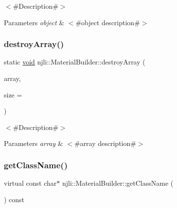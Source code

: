 $<$\#\+Description\#$>$


\begin{DoxyParams}{Parameters}
{\em object} & $<$\#object description\#$>$ \\
\hline
\end{DoxyParams}
\mbox{\label{classnjli_1_1_material_builder_ae9f327274245a38631fbe03c44479583}} 
\subsubsection{\texorpdfstring{destroy\+Array()}{destroyArray()}}
{\footnotesize\ttfamily static \mbox{\hyperlink{_thread_8h_af1e856da2e658414cb2456cb6f7ebc66}{void}} njli\+::\+Material\+Builder\+::destroy\+Array (\begin{DoxyParamCaption}\item[{\mbox{\hyperlink{classnjli_1_1_material_builder}{Material\+Builder}} $\ast$$\ast$}]{array,  }\item[{const \mbox{\hyperlink{_util_8h_a10e94b422ef0c20dcdec20d31a1f5049}{u32}}}]{size = {} }\end{DoxyParamCaption})\hspace{0.3cm}{\ttfamily [static]}}

$<$\#\+Description\#$>$


\begin{DoxyParams}{Parameters}
{\em array} & $<$\#array description\#$>$ \\
\hline
\end{DoxyParams}
\mbox{\label{classnjli_1_1_material_builder_a7114856dcf01d474cab30bfd63e66930}} 
\subsubsection{\texorpdfstring{get\+Class\+Name()}{getClassName()}}
{\footnotesize\ttfamily virtual const char$\ast$ njli\+::\+Material\+Builder\+::get\+Class\+Name (\begin{DoxyParamCaption}{ }\end{DoxyParamCaption}) const\hspace{0.3cm}{\ttfamily [virtual]}}

